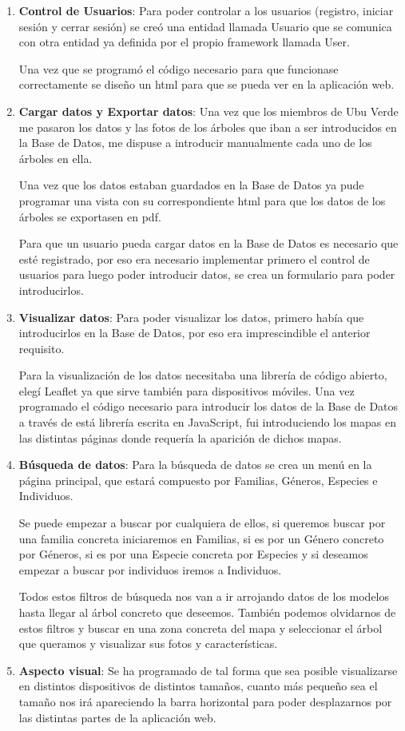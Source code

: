 \begin{enumerate}
	\item \textbf{Control de Usuarios}: Para poder controlar a los usuarios (registro, iniciar sesión y cerrar sesión) se creó una entidad llamada Usuario que se comunica con otra entidad ya definida por el propio framework llamada User. 
	
	Una vez que se programó el código necesario para que funcionase correctamente se diseño un html para que se pueda ver en la aplicación web.
	
	\item \textbf{Cargar datos y Exportar datos}: Una vez que los miembros de Ubu Verde me pasaron los datos y las fotos de los árboles que iban a ser introducidos en la Base de Datos, me dispuse a introducir manualmente cada uno de los árboles en ella.
	 
	Una vez que los datos estaban guardados en la Base de Datos ya pude programar una vista con su correspondiente html para que los datos de los árboles se exportasen en pdf.
	
	Para que un usuario pueda cargar datos en la Base de Datos es necesario que esté registrado, por eso era necesario implementar primero el control de usuarios para luego poder introducir datos, se crea un formulario para poder introducirlos.
	
	\item \textbf{Visualizar datos}: Para poder visualizar los datos, primero había que introducirlos en la Base de Datos, por eso era imprescindible el anterior requisito.
	
	Para la visualización de los datos necesitaba una librería de código abierto, elegí Leaflet \cite{Leaflet} ya que sirve también para dispositivos móviles. Una vez programado el código necesario para introducir los datos de la Base de Datos a través de está librería escrita en JavaScript, fui introduciendo los mapas en las distintas páginas donde requería la aparición de dichos mapas.
	
	\item \textbf{Búsqueda de datos}: Para la búsqueda de datos se crea un menú en la página principal, que estará compuesto por Familias, Géneros, Especies e Individuos.
	
	Se puede empezar a buscar por cualquiera de ellos, si queremos buscar por una familia concreta iniciaremos en Familias, si es por un Género concreto por Géneros, si es por una Especie concreta por Especies y si deseamos empezar a buscar por individuos iremos a Individuos.
	
	Todos estos filtros de búsqueda nos van a ir arrojando datos de los modelos hasta llegar al árbol concreto que deseemos. También podemos olvidarnos de estos filtros y buscar en una zona concreta del mapa y seleccionar el árbol que queramos y visualizar sus fotos y características.
	
	\item \textbf{Aspecto visual}: Se ha programado de tal forma que sea posible visualizarse en distintos dispositivos de distintos tamaños, cuanto más pequeño sea el tamaño nos irá apareciendo la barra horizontal para poder desplazarnos por las distintas partes de la aplicación web.
\end{enumerate}

